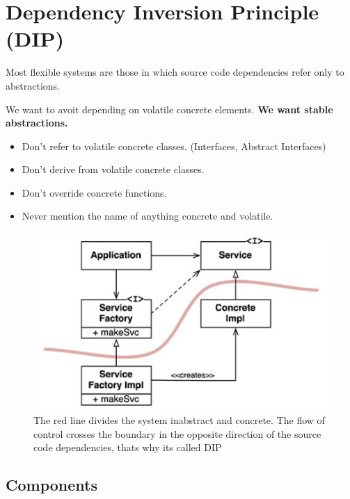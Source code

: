 \documentclass[../Main.tex]{subfiles}
\begin{document}
\section{Dependency Inversion Principle (DIP)}
Most flexible systems are those in which source code dependencies refer only to abstractions.

We want to avoit depending on volatile concrete elements.
\textbf{We want stable abstractions.}

\begin{itemize}
    \item Don't refer to volatile concrete classes. (Interfaces, Abstract Interfaces)
    \item Don't derive from volatile concrete classes.
    \item Don't override concrete functions.
    \item Never mention the name of anything concrete and volatile.
\end{itemize}

\begin{figure}[H]
    \centering
    \includegraphics[width=0.75\linewidth]{Images/cleanarch/dip-factory.png}
    \caption{The red line divides the system inabstract and concrete. The flow of control crosses
    the boundary in the opposite direction of the source code dependencies, thats why its called DIP}
\end{figure}

\subsection{Components}

\end{document}
